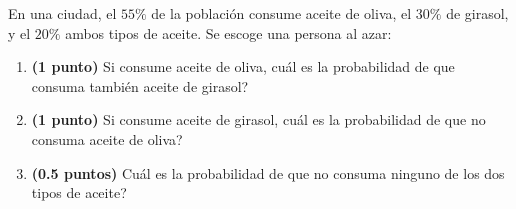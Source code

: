 
En una ciudad, el $55\%$ de la población consume aceite de oliva, el $30\%$ de girasol, y el $20\%$ ambos tipos de aceite. Se escoge una persona al azar:
\begin{enumerate}[label=\alph*)]
\item \textbf{(1 punto)} Si consume aceite de oliva, \textquestiondown{}cuál es la probabilidad de que consuma también aceite de girasol?
\item \textbf{(1 punto)} Si consume aceite de girasol, \textquestiondown{}cuál es la probabilidad de que no consuma aceite de oliva?
\item \textbf{(0.5 puntos)} \textquestiondown{}Cuál es la probabilidad de que no consuma ninguno de los dos tipos de aceite?
\end{enumerate}
